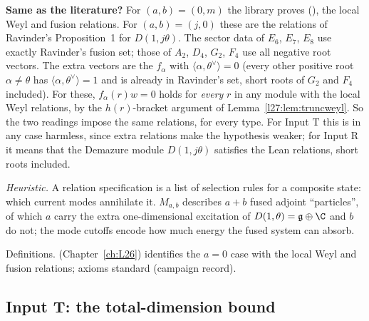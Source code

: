 \begin{dictionary}
\textbf{Same as the literature?} For $(a,b)=(0,m)$ the library proves  (), the
local Weyl and fusion relations. For $(a,b)=(j,0)$ these are the relations of Ravinder's Proposition~1 for $D(1,j\theta)$.
The sector data of $E_6$, $E_7$, $E_8$ use exactly Ravinder's fusion set; those of $A_2$, $D_4$, $G_2$, $F_4$ use all negative
root vectors. The extra vectors are the $f_\alpha$ with $\langle\alpha,\theta^\vee\rangle=0$ (every other positive root
$\alpha\neq\theta$ has $\langle\alpha,\theta^\vee\rangle=1$ and is already in Ravinder's set, short roots of $G_2$ and $F_4$
included). For these, $f_\alpha(r)w=0$ holds for \emph{every} $r$ in any module with the local Weyl relations, by the
$h(r)$-bracket argument of Lemma~\ref{l27:lem:truncweyl}. So the two readings impose the same relations, for every type. For
Input T this is in any case harmless, since extra relations make the hypothesis weaker; for Input R it means that the
Demazure module $D(1,j\theta)$ satisfies the Lean relations, short roots included.
\end{dictionary}

\begin{physics}
\emph{Heuristic.} A relation specification is a list of selection rules for a composite state: which current modes
annihilate it. $M_{a,b}$ describes $a+b$ fused adjoint ``particles'', of which $a$ carry the extra one-dimensional excitation
of $D(1,\theta)=\ltwentyseveng\oplus\C$ and $b$ do not; the mode cutoffs encode how much energy the fused system can absorb.
\end{physics}

\begin{status}
Definitions.  (Chapter~\ref{ch:L26}) identifies the $a=0$ case with the local Weyl and fusion relations;
axioms standard (campaign record).
\end{status}

\subsection{Input T: the total-dimension bound}\label{l27:sec:totaldim}

